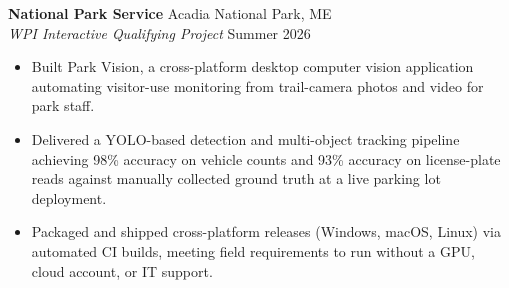 \textbf{National Park Service} \hfill Acadia National Park, ME\\
\textit{WPI Interactive Qualifying Project} \hfill Summer 2026
\begin{itemize}
  \item Built Park Vision, a cross-platform desktop computer vision application automating visitor-use monitoring from trail-camera photos and video for park staff.
  \item Delivered a YOLO-based detection and multi-object tracking pipeline achieving 98\% accuracy on vehicle counts and 93\% accuracy on license-plate reads against manually collected ground truth at a live parking lot deployment.
  \item Packaged and shipped cross-platform releases (Windows, macOS, Linux) via automated CI builds, meeting field requirements to run without a GPU, cloud account, or IT support.
\end{itemize}
